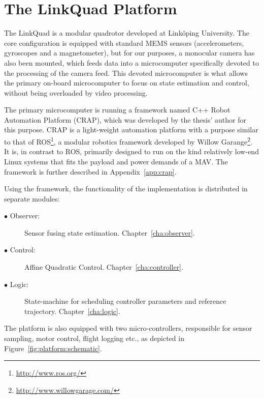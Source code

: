 \section{The LinkQuad Platform}
    The LinkQuad is a modular quadrotor developed at Linköping University.
    The core configuration is equipped with standard MEMS sensors
    (accelerometers, gyroscopes and a magnetometer),
    but for our purposes, a monocular camera has also been mounted, which feeds data
    into a microcomputer specifically devoted to the processing of the camera feed.
    This devoted microcomputer is what allows the primary on-board microcomputer
    to focus on state estimation and control, without being overloaded by
    video processing.

    The primary microcomputer is running a framework named C++ Robot Automation Platform (CRAP),
    which was developed by the thesis' author for this purpose. CRAP is a light-weight
    automation platform with a purpose similar to that of ROS\footnote{\url{http://www.ros.org/}}, a
    modular robotics framework developed by Willow Garange\footnote{\url{http://www.willowgarage.com/}}.
    It is, in contrast to ROS, primarily designed to run on the kind relatively low-end Linux systems
    that fits the payload and power demands of a MAV. The framework is further
    described in Appendix~\ref{app:crap}.

    Using the framework, the functionality of the implementation is
    distributed in separate modules:
    \begin{description}
        \item[$\bullet$ Observer:] Sensor fusing state estimation. Chapter~\ref{cha:observer}.
        \item[$\bullet$ Control:]  Affine Quadratic Control. Chapter~\ref{cha:controller}.
        \item[$\bullet$ Logic:]    State-machine for scheduling controller parameters and reference trajectory. Chapter~\ref{cha:logic}.
    \end{description}

    The platform is also equipped with two micro-controllers, responsible
    for sensor sampling, motor control, flight logging etc., as depicted in
    Figure~\ref{fig:platform:schematic}.


